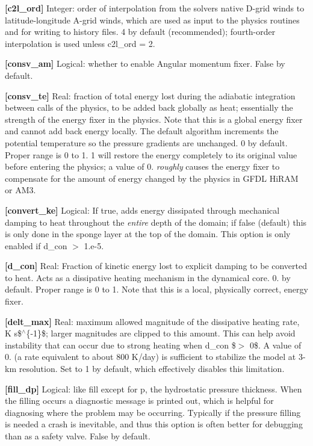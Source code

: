 {\bfseries \mbox{[}c2l\+\_\+ord\mbox{]}} Integer\+: order of interpolation from the solvers native D-\/grid winds to latitude-\/longitude A-\/grid winds, which are used as input to the physics routines and for writing to history files. 4 by default (recommended); fourth-\/order interpolation is used unless c2l\+\_\+ord = 2.

{\bfseries \mbox{[}consv\+\_\+am\mbox{]}} Logical\+: whether to enable Angular momentum fixer. False by default.

{\bfseries \mbox{[}consv\+\_\+te\mbox{]}} Real\+: fraction of total energy lost during the adiabatic integration between calls of the physics, to be added back globally as heat; essentially the strength of the energy fixer in the physics. Note that this is a global energy fixer and cannot add back energy locally. The default algorithm increments the potential temperature so the pressure gradients are unchanged. 0 by default. Proper range is 0 to 1. 1 will restore the energy completely to its original value before entering the physics; a value of 0. {\itshape roughly} causes the energy fixer to compensate for the amount of energy changed by the physics in G\+F\+DL Hi\+R\+AM or A\+M3.

{\bfseries \mbox{[}convert\+\_\+ke\mbox{]}} Logical\+: If true, adds energy dissipated through mechanical damping to heat throughout the {\itshape entire} depth of the domain; if false (default) this is only done in the sponge layer at the top of the domain. This option is only enabled if d\+\_\+con $>$ 1.\+e-\/5.

{\bfseries \mbox{[}d\+\_\+con\mbox{]}} Real\+: Fraction of kinetic energy lost to explicit damping to be converted to heat. Acts as a dissipative heating mechanism in the dynamical core. 0. by default. Proper range is 0 to 1. Note that this is a local, physically correct, energy fixer.

{\bfseries \mbox{[}delt\+\_\+max\mbox{]}} Real\+: maximum allowed magnitude of the dissipative heating rate, K s\$$^\wedge$\{-\/1\}\$; larger magnitudes are clipped to this amount. This can help avoid instability that can occur due to strong heating when d\+\_\+con \$$>$ 0\$. A value of 0. (a rate equivalent to about 800 K/day) is sufficient to stabilize the model at 3-\/km resolution. Set to 1 by default, which effectively disables this limitation.

{\bfseries \mbox{[}fill\+\_\+dp\mbox{]}} Logical\+: like fill except for {\ttfamily p}, the hydrostatic pressure thickness. When the filling occurs a diagnostic message is printed out, which is helpful for diagnosing where the problem may be occurring. Typically if the pressure filling is needed a crash is inevitable, and thus this option is often better for debugging than as a safety valve. False by default.

